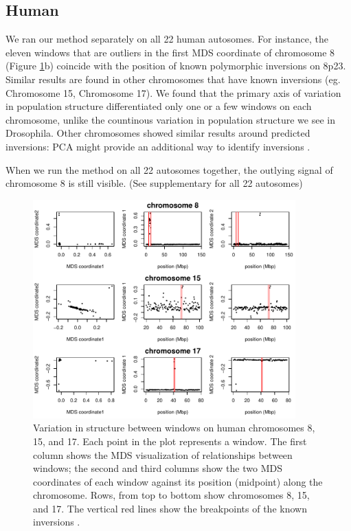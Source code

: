 \documentclass[11pt, oneside]{article}   	%
\begin{document}
\subsection{Human}
We ran our method separately on all 22 human autosomes. 
For instance, the eleven windows that are outliers in the first MDS coordinate of chromosome 8 (Figure \ref{fig:mds_human}b) coincide with the position of known polymorphic inversions on 8p23. 
Similar results are found in other chromosomes that have known inversions (eg. Chromosome 15, Chromosome 17).
We found that the primary axis of variation in population structure differentiated only one or a few windows on each chromosome, 
unlike the countinous variation in population structure we see in Drosophila.
Other chromosomes showed similar results around predicted inversions: PCA might provide an additional way to identify inversions \citep{ma2012investigation}.

When we run the method on all 22 autosomes together, the outlying signal of chromosome 8 is still visible. (See supplementary for all 22 autosomes)

\begin{figure}
    \begin{center}
       \includegraphics[width=0.9\textwidth]{Fig4_POPRES_Together_MDS_plot_chr8_15_17}
    \end{center}
    \caption{
         Variation in structure between windows on human chromosomes 8, 15, and 17. 
         Each point in the plot represents a window.
         The first column shows the MDS visualization of relationships between windows;
         the second and third columns show the two MDS coordinates of each window against its position (midpoint) along the chromosome. 
         Rows, from top to bottom show chromosomes 8, 15, and 17. 
         The vertical red lines show the breakpoints of the known inversions \citep{antonacci2009characterization}.
        \label{fig:mds_human}
    }
\end{figure}
\end{document}
